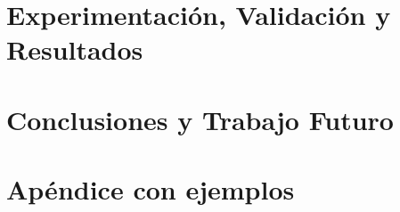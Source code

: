 \documentclass[twoside,spanish,a4paper,12pt]{tfm}
\begin{document}
\chapter{Experimentación, Validación y Resultados}


\chapter{Conclusiones y Trabajo Futuro}


\cleardoublepage
\ia
\cleardoublepage

\pagestyle{appendix}

\appendix
\chapter{Apéndice con ejemplos}





\cleardoublepage
\contraportada
\end{document}
